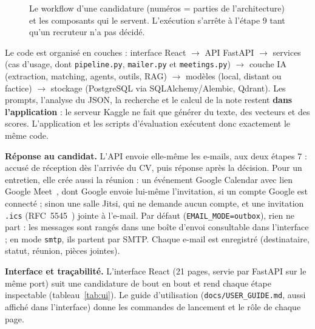 \documentclass[11pt,a4paper]{report}
\begin{document}
\begin{figure}[ht]
\caption{Le workflow d'une candidature (numéros = parties de l'architecture) et les composants qui le servent. L'exécution s'arrête à l'étape 9 tant qu'un recruteur n'a pas décidé.}
\label{fig:workflow}
\end{figure}

Le code est organisé en couches : interface React $\rightarrow$ API FastAPI $\rightarrow$ services (cas d'usage, dont \texttt{pipeline.py}, \texttt{mailer.py} et \texttt{meetings.py}) $\rightarrow$ couche IA (extraction, matching, agents, outils, RAG) $\rightarrow$ modèles (local, distant ou factice) $\rightarrow$ stockage (PostgreSQL via SQLAlchemy/Alembic, Qdrant). Les prompts, l'analyse du JSON, la recherche et le calcul de la note restent \textbf{dans l'application} : le serveur Kaggle ne fait que générer du texte, des vecteurs et des scores. L'application et les scripts d'évaluation exécutent donc exactement le même code.

\textbf{Réponse au candidat.} L'API envoie elle-même les e-mails, aux deux étapes 7 : accusé de réception dès l'arrivée du CV, puis réponse après la décision. Pour un entretien, elle crée aussi la réunion : un événement Google Calendar avec lien Google Meet~\cite{gcal}, dont Google envoie lui-même l'invitation, si un compte Google est connecté ; sinon une salle Jitsi, qui ne demande aucun compte, et une invitation \texttt{.ics} (RFC~5545~\cite{ics}) jointe à l'e-mail. Par défaut (\texttt{EMAIL\_MODE=outbox}), rien ne part : les messages sont rangés dans une boîte d'envoi consultable dans l'interface ; en mode \texttt{smtp}, ils partent par SMTP. Chaque e-mail est enregistré (destinataire, statut, réunion, pièces jointes).

\textbf{Interface et traçabilité.} L'interface React (21 pages, servie par FastAPI sur le même port) suit une candidature de bout en bout et rend chaque étape inspectable (tableau~\ref{tab:ui}). Le guide d'utilisation (\texttt{docs/USER\_GUIDE.md}, aussi affiché dans l'interface) donne les commandes de lancement et le rôle de chaque page.
\end{document}
